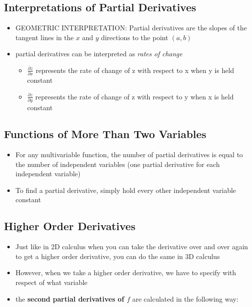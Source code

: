 \documentclass{package/notes}
\begin{document}
\subsection{Interpretations of Partial Derivatives}

\begin{itemize}
	\item GEOMETRIC INTERPRETATION: Partial derivatives are the slopes of the tangent lines in the $x$ and $y$ directions to the point $(a,b)$ 
	\item partial derivatives can be interpreted as \textit{rates of change}
	\begin{itemize}
		\item $\frac{\partial z}{\partial x}$ represents the rate of change of z with respect to x when y is held constant
		\item $\frac{\partial z}{\partial y}$ represents the rate of change of z with respect to y when x is held constant
	\end{itemize}
\end{itemize}


\subsection{Functions of More Than Two Variables}

\begin{itemize}
	\item For any multivariable function, the number of partial derivatives is equal to the number of independent variables (one partial derivative for each independent variable)
	\item To find a partial derivative, simply hold every other independent variable constant
\end{itemize}


\subsection{Higher Order Derivatives}

\begin{itemize}
	\item Just like in 2D calculus when you can take the derivative over and over again to get a higher order derivative, you can do the same in 3D calculus
	\item However, when we take a higher order derivative, we have to specify with respect of what variable 
	\item the \textbf{second partial derivatives of $f$} are calculated in the following way:
\end{itemize}
\end{document}
